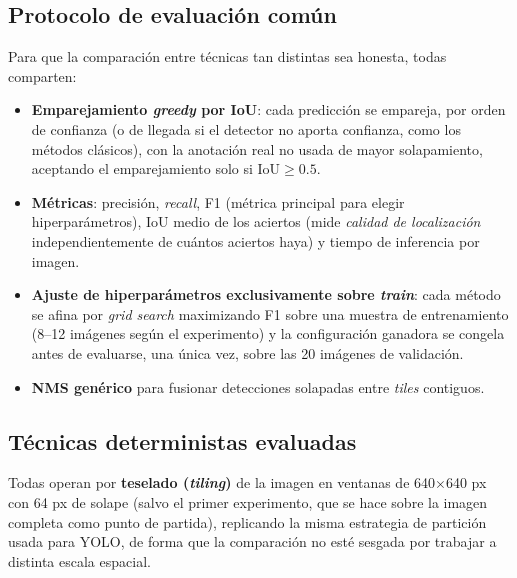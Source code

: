 \documentclass[11pt,a4paper]{article}
\begin{document}
\subsection{Protocolo de evaluación común}

Para que la comparación entre técnicas tan distintas sea honesta, todas comparten:

\begin{itemize}
    \item \textbf{Emparejamiento \emph{greedy} por IoU}: cada predicción se empareja,
    por orden de confianza (o de llegada si el detector no aporta confianza, como los
    métodos clásicos), con la anotación real no usada de mayor solapamiento,
    aceptando el emparejamiento solo si $\text{IoU} \geq 0.5$.
    \item \textbf{Métricas}: precisión, \emph{recall}, F1 (métrica principal para
    elegir hiperparámetros), IoU medio de los aciertos (mide \emph{calidad de
    localización} independientemente de cuántos aciertos haya) y tiempo de
    inferencia por imagen.
    \item \textbf{Ajuste de hiperparámetros exclusivamente sobre \emph{train}}: cada
    método se afina por \emph{grid search} maximizando F1 sobre una muestra de
    entrenamiento (8--12 imágenes según el experimento) y la configuración ganadora
    se congela antes de evaluarse, una única vez, sobre las 20 imágenes de
    validación.
    \item \textbf{NMS genérico} para fusionar detecciones solapadas entre
    \emph{tiles} contiguos.
\end{itemize}

\subsection{Técnicas deterministas evaluadas}

Todas operan por \textbf{teselado (\emph{tiling})} de la imagen en ventanas de
640$\times$640 px con 64 px de solape (salvo el primer experimento, que se hace sobre
la imagen completa como punto de partida), replicando la misma estrategia de
partición usada para YOLO, de forma que la comparación no esté sesgada por trabajar a
distinta escala espacial.
\end{document}
